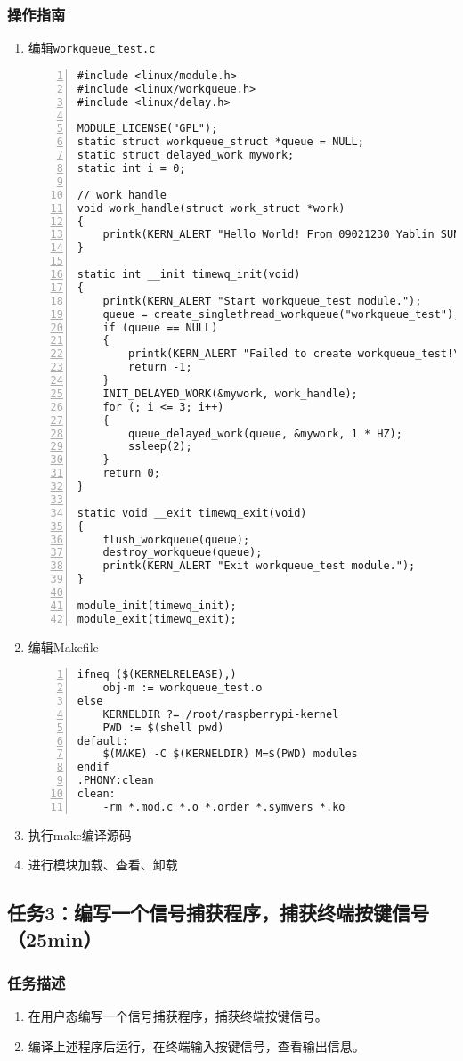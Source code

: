 \documentclass{article}
\begin{document}
\subsubsection{操作指南}
\begin{enumerate}

	\item 编辑\verb|workqueue_test.c|
	      \begin{lstlisting}[numbers=left]
#include <linux/module.h>
#include <linux/workqueue.h>
#include <linux/delay.h>

MODULE_LICENSE("GPL");
static struct workqueue_struct *queue = NULL;
static struct delayed_work mywork;
static int i = 0;

// work handle
void work_handle(struct work_struct *work)
{
	printk(KERN_ALERT "Hello World! From 09021230 Yablin SUN\n");
}

static int __init timewq_init(void)
{
	printk(KERN_ALERT "Start workqueue_test module.");
	queue = create_singlethread_workqueue("workqueue_test");
	if (queue == NULL)
	{
		printk(KERN_ALERT "Failed to create workqueue_test!\n");
		return -1;
	}
	INIT_DELAYED_WORK(&mywork, work_handle);
	for (; i <= 3; i++)
	{
		queue_delayed_work(queue, &mywork, 1 * HZ);
		ssleep(2);
	}
	return 0;
}

static void __exit timewq_exit(void)
{
	flush_workqueue(queue);
	destroy_workqueue(queue);
	printk(KERN_ALERT "Exit workqueue_test module.");
}

module_init(timewq_init);
module_exit(timewq_exit);

\end{lstlisting}
	\item 编辑Makefile
	      \begin{lstlisting}[numbers=left]
ifneq ($(KERNELRELEASE),)
	obj-m := workqueue_test.o
else
	KERNELDIR ?= /root/raspberrypi-kernel
	PWD := $(shell pwd)
default:
	$(MAKE) -C $(KERNELDIR) M=$(PWD) modules
endif
.PHONY:clean
clean:
	-rm *.mod.c *.o *.order *.symvers *.ko
\end{lstlisting}
	\item 执行make编译源码
	\item 进行模块加载、查看、卸载
\end{enumerate}

\newpage
\subsection{任务3：编写一个信号捕获程序，捕获终端按键信号（25min）}

\subsubsection{任务描述}
\begin{enumerate}
	\item 在用户态编写一个信号捕获程序，捕获终端按键信号。
	\item 编译上述程序后运行，在终端输入按键信号，查看输出信息。
\end{enumerate}
\end{document}
